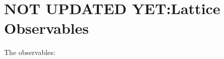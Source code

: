 \documentclass[../../RotatingBosons.tex]{subfiles}
\begin{document}
%



\section{\label{NRRBObservables}NOT UPDATED YET:Lattice Observables}
The observables:
\end{document}
